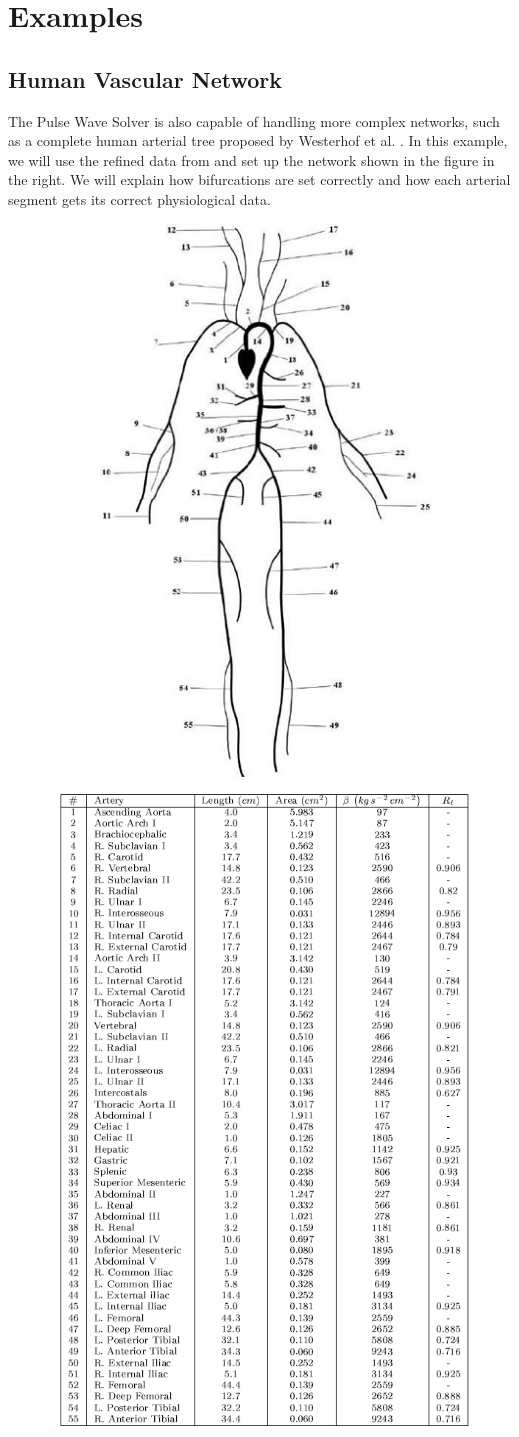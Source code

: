 \section{Examples}

\subsection{Human Vascular Network}
The Pulse Wave Solver is also capable of handling more complex networks, such as
a complete human arterial tree proposed by Westerhof et al. \cite{We69}.
In this example, we will use the refined data from \cite{ShFoPeFr03} and set up
the network shown in the figure in the right. We will explain how bifurcations
are set correctly and how each arterial segment gets its correct physiological
data.

\begin{figure}
	\includegraphics[width=0.49\linewidth]{Figures/55_artery_network.jpg}
	\includegraphics[width=0.49\linewidth]{Figures/Data_Table.png}
\end{figure}


